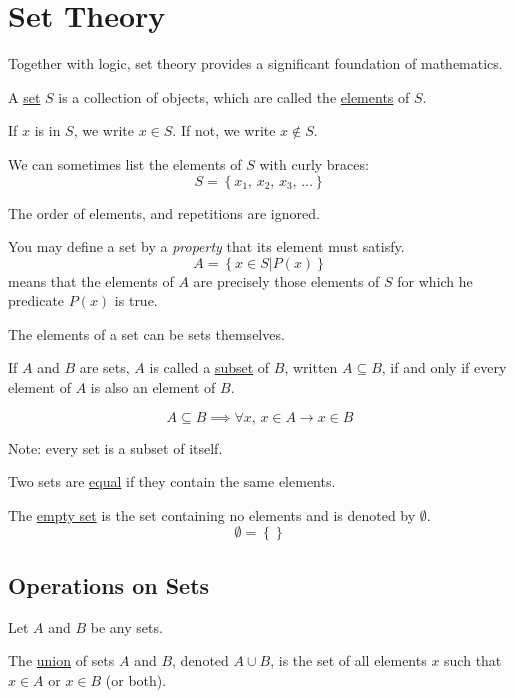 \section{Set Theory}
Together with logic, set theory provides a significant foundation of mathematics.

\begin{definition}
    A \underline{set} $S$ is a collection of objects, which are called the \underline{elements} of $S$.

    If $x$ is in $S$, we write $x\in S$. If not, we write $x\notin S$.

    We can sometimes list the elements of $S$ with curly braces: $$S = \left\{x_1,\,x_2,\,x_3,\,\dots\right\}$$

    The order of elements, and repetitions are ignored.
\end{definition}

You may define a set by a \emph{property} that its element must satisfy. $$A = \left\{x\in S | P(x)\right\}$$ means that the elements of $A$ are precisely those elements of $S$ for which he predicate $P(x)$ is true.

The elements of a set can be sets themselves.

\begin{definition}
    If $A$ and $B$ are sets, $A$ is called a \underline{subset} of $B$, written $A\subseteq B$, if and only if every element of $A$ is also an element of $B$.

    $$A \subseteq B \implies \forall x,\, x\in A \rightarrow x\in B$$
    
    Note: every set is a subset of itself.
\end{definition}


\begin{definition}
    Two sets are \underline{equal} if they contain the same elements.
\end{definition}

\begin{definition}
    The \underline{empty set} is the set containing no elements and is denoted by $\emptyset$. $$\emptyset = \left\{\right\}$$
\end{definition}

\subsection{Operations on Sets}
Let $A$ and $B$ be any sets.

The \underline{union} of sets $A$ and $B$, denoted $A\cup B$, is the set of all elements $x$ such that $x\in A$ or $x\in B$ (or both).

